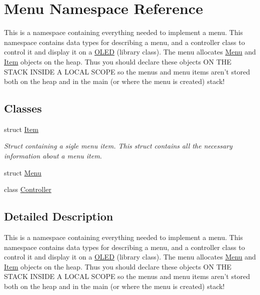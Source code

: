 \hypertarget{namespace_menu}{\section{Menu Namespace Reference}
\label{namespace_menu}
}


This is a namespace containing everything needed to implement a menu. This namespace contains data types for describing a menu, and a controller class to control it and display it on a \hyperlink{class_o_l_e_d}{O\-L\-E\-D} (library class). The menu allocates \hyperlink{namespace_menu}{Menu} and \hyperlink{struct_menu_1_1_item}{Item} objects on the heap. Thus you should declare these objects O\-N T\-H\-E S\-T\-A\-C\-K I\-N\-S\-I\-D\-E A L\-O\-C\-A\-L S\-C\-O\-P\-E so the menus and menu items aren't stored both on the heap and in the main (or where the menu is created) stack!  


\subsection*{Classes}
\begin{DoxyCompactItemize}
\item 
struct \hyperlink{struct_menu_1_1_item}{Item}
\begin{DoxyCompactList}\small\item\em Struct containing a sigle menu item. This struct contains all the necessary information about a menu item. \end{DoxyCompactList}\item 
struct \hyperlink{struct_menu_1_1_menu}{Menu}
\item 
class \hyperlink{class_menu_1_1_controller}{Controller}
\end{DoxyCompactItemize}


\subsection{Detailed Description}
This is a namespace containing everything needed to implement a menu. This namespace contains data types for describing a menu, and a controller class to control it and display it on a \hyperlink{class_o_l_e_d}{O\-L\-E\-D} (library class). The menu allocates \hyperlink{namespace_menu}{Menu} and \hyperlink{struct_menu_1_1_item}{Item} objects on the heap. Thus you should declare these objects O\-N T\-H\-E S\-T\-A\-C\-K I\-N\-S\-I\-D\-E A L\-O\-C\-A\-L S\-C\-O\-P\-E so the menus and menu items aren't stored both on the heap and in the main (or where the menu is created) stack! 